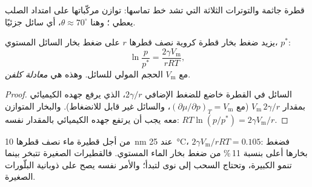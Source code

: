 \begin{omfigure}

{\small قطرة جاثمة والتوترات الثلاثة التي تشد خط تماسها:
توازن مركّباتها على امتداد الصلب يعطي ؛ وهنا $\theta
\approx 70^\circ$، أي سائل  جزئيًا.}
\end{omfigure}

\begin{theorem}\label{thm:b3:colloids:kelvin}
يزيد ضغط بخار قطرة كروية نصف قطرها $r$ على ضغط بخار السائل
المستوي، $p^*$:
\[
  \ln\frac{p}{p^*} = \frac{2\gamma V_{\mathrm m}}{rRT},
\]
مع $V_{\mathrm m}$ الحجم المولي للسائل. وهذه هي \emph{معادلة
كلفن}.
\end{theorem}

\begin{proof}
السائل في القطرة خاضع للضغط الإضافي $2\gamma/r$، الذي يرفع
جهده الكيميائي بمقدار $V_{\mathrm m}\,2\gamma/r$ (مع $(\partial\mu/\partial p)_T = V_{\mathrm m}$، والسائل غير قابل للانضغاط).
والبخار المتوازن معه يجب أن يرتفع جهده الكيميائي
بالمقدار نفسه: $RT\ln(p/p^*) = 2\gamma V_{\mathrm m}/r$.
\end{proof}

من أجل قطيرة ماء نصف قطرها \qty{10}{nm} عند \qty{25}{\celsius}، $2\gamma V_{\mathrm m}/rRT = 0.105$: فضغط بخارها
أعلى بنسبة 11\,\% من ضغط بخار الماء المستوي. فالقطيرات الصغيرة تتبخر بينما
تنمو الكبيرة، وتحتاج السحب إلى نوى لتبدأ؛ والأمر نفسه يصح على
ذوبانية البلّورات الصغيرة.

